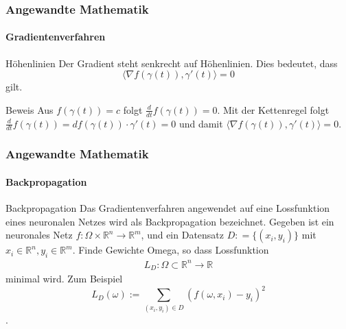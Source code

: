 \documentclass{beamer}
\begin{document}
\begin{frame}
    \frametitle{Angewandte Mathematik}
\framesubtitle{Gradientenverfahren}
    \begin{block}{Höhenlinien}
Der Gradient steht senkrecht auf  Höhenlinien. Dies bedeutet, dass $$ \bigl \langle \nabla f(\gamma(t)), \gamma'(t) \bigr \rangle = 0$$ gilt. 

\end{block}
    \begin{block}{Beweis}
Aus $f(\gamma(t)) = c$ folgt $\frac{d}{dt} f(\gamma(t)) = 0$. Mit der Kettenregel folgt $\frac{d}{dt} f(\gamma(t)) =  df(\gamma(t)) \cdot \gamma'(t) = 0$ und damit
$ \bigl \langle \nabla f(\gamma(t)), \gamma'(t) \bigr \rangle = 0$.
\end{block}

 \end{frame}



\begin{frame}
    \frametitle{Angewandte Mathematik}
\framesubtitle{Backpropagation}
    \begin{block}{Backpropagation}
Das Gradientenverfahren angewendet auf eine Lossfunktion eines neuronalen Netzes wird als Backpropagation bezeichnet.
Gegeben ist ein neuronales Netz $f : \Omega \times \mathbb{R}^n \to \mathbb{R}^m$, 
und ein  Datensatz $D : = \{ (x_i, y_i) \}$ mit $x_i \in \mathbb{R}^n, y_i \in \mathbb{R}^m$. Finde Gewichte Omega, so dass Lossfunktion
\begin{align*}
L_D  : \Omega \subset \mathbb{R}^n \to \mathbb{R} 
\end{align*}
minimal wird. Zum Beispiel $$L_D(\omega) := \sum_{(x_i,y_i) \in D} (f(\omega, x_i) - y_i)^2$$.

\end{block}
 \end{frame}
\end{document}
